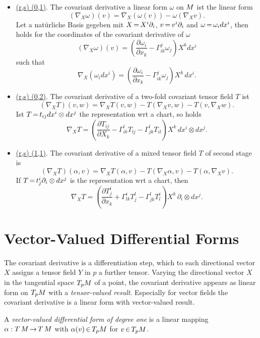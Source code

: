 \documentclass[11pt,twoside]{article}
\begin{document}
\begin{example}
\begin{itemize}[leftmargin=15pt]
\item[1.]
\underline{(r,s) \eq (0,1)}.
The covariant derivative a linear form $\omega$ on ${M}$
ist the linear form
\[
(\nabla_X \omega)(v) = \nabla_X (\omega(v)) -  \omega(\nabla_X v).
\]
Let a nat\"urliche Basis gegeben mit
$X {\,=\,} X^i \partial_i$, $v {\,=\,} v^i \partial_i$ and $\omega {\,=\,} \omega_i dx^i$,
then holds for the coordinates of the covariant derivative of $\omega$
\[
(\nabla_X \omega)(v) =
(\frac {\partial \omega_i}{\partial x_k} - \Gamma^j_{ik} \omega_j) X^k dx^i
\]
such that
\[
\nabla_X( \omega_i dx^i ) =
(\frac {\partial \omega_i}{\partial x_k} - \Gamma^j_{ik} \omega_j) X^k \, dx^i.
\]
\item[2.]
\underline{(r,s) \eq (0,2)}.
The covariant derivative of a two-fold covariant tensor field $T$ ist
\[
(\nabla_X T)(v,w) =
\nabla_X T(v,w) - T(\nabla_X v,w) - T(v, \nabla_X w).
\]
Ist $T {\,=\,} t_{ij} dx^i \otimes dx^j$ the representation {wrt} a chart,
so holds
\[
\nabla_X T = ( \frac { \partial T_{ij}}{\partial X_k} -
\Gamma^l_{ik} T_{lj} - \Gamma^l_{jk} T_{il} ) X^k \, dx^i \otimes dx^j.
\]
\item[3.]
\underline{(r,s) \eq (1,1)}.
The covariant derivative of a mixed tensor field $T$ of second stage is
\[
(\nabla_X T)(\alpha,v) =
\nabla_X T(\alpha,v) - T(\nabla_X \alpha,v) - T(\alpha, \nabla_X v).
\]
If $T {\,=\,} t^i_j \partial_i \otimes dx^j$ is the representation {wrt} a chart,
then
\[
\nabla_X T = ( \frac { \partial T^i_j}{\partial x_k} +
\Gamma^i_{lk} T^l_j - \Gamma^l_{jk} T^i_l ) X^k \, \partial_i \otimes dx^j.
\]
\end{itemize}
\end{example}

\section{Vector-Valued Differential Forms}
The covariant derivative is a differentiation step,
which to each directional vector $X$ assigns a tensor field $Y$ in $p$
a further tensor.
Varying the directional vector $X$ in the tangential space $T_p {M}$
of a point,
the covariant derivative appears as linear form on $T_p {M}$
with a \textit{tensor-valued result}.
Especially for vector fields the covariant derivative
is a linear form with vector-valued result.

\begin{definition}
A \textit{vector-valued differential form of degree one}
is a linear mapping
$\alpha: T\,{M} {\,\to\,} T\,{M}$ with $\alpha(v) {\,\in\,} T_p {M}$
for $v {\,\in\,} T_p {M}$.
\end{definition}
\end{document}
